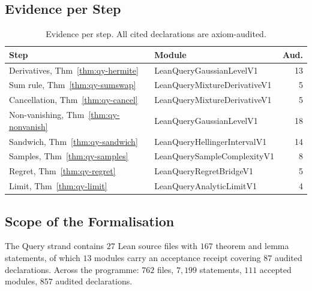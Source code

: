 \documentclass[conference]{IEEEtran}
\theoremstyle{definition}
\newcommand{\lean}[1]{\textsf{\footnotesize #1}}
\begin{document}
\subsection{Evidence per Step}

\begin{table}[htbp]
\caption{Evidence per step. All cited declarations are axiom-audited.}
\label{tab:qy-inventory}
\centering\footnotesize\setlength{\tabcolsep}{3pt}
\begin{tabular}{@{}llr@{}}
\toprule
Step & Module & Aud. \\
\midrule
Derivatives, Thm~\ref{thm:qy-hermite}     & \lean{LeanQueryGaussianLevelV1}     & 13 \\
Sum rule, Thm~\ref{thm:qy-sumswap}        & \lean{LeanQueryMixtureDerivativeV1} &  5 \\
Cancellation, Thm~\ref{thm:qy-cancel}     & \lean{LeanQueryMixtureDerivativeV1} &  5 \\
Non-vanishing, Thm~\ref{thm:qy-nonvanish} & \lean{LeanQueryGaussianLevelV1}     & 18 \\
Sandwich, Thm~\ref{thm:qy-sandwich}       & \lean{LeanQueryHellingerIntervalV1} & 14 \\
Samples, Thm~\ref{thm:qy-samples}         & \lean{LeanQuerySampleComplexityV1}  &  8 \\
Regret, Thm~\ref{thm:qy-regret}           & \lean{LeanQueryRegretBridgeV1}      &  5 \\
Limit, Thm~\ref{thm:qy-limit}             & \lean{LeanQueryAnalyticLimitV1}     &  4 \\
\bottomrule
\end{tabular}
\end{table}

\subsection{Scope of the Formalisation}

The Query strand contains $27$ Lean source files with $167$ theorem and lemma statements,
of which $13$ modules carry an acceptance receipt covering $87$ audited declarations. Across
the programme: $762$ files, $7{,}199$ statements, $111$ accepted modules, $857$ audited
declarations.
\end{document}
